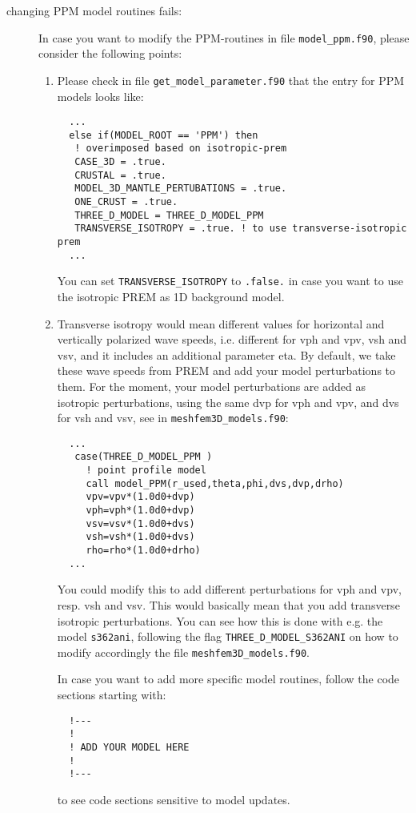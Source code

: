 \begin{description}
\item [changing PPM model routines fails:]
In case you want to modify the PPM-routines in file \texttt{model\_ppm.f90}, please consider the following points:

\begin{enumerate}
\item Please check in file \texttt{get\_model\_parameter.f90} that the entry for PPM models looks like:

{\footnotesize
\begin{verbatim}
  ...
  else if(MODEL_ROOT == 'PPM') then
   ! overimposed based on isotropic-prem
   CASE_3D = .true.
   CRUSTAL = .true.
   MODEL_3D_MANTLE_PERTUBATIONS = .true.
   ONE_CRUST = .true.
   THREE_D_MODEL = THREE_D_MODEL_PPM
   TRANSVERSE_ISOTROPY = .true. ! to use transverse-isotropic prem
  ...
\end{verbatim}
}

\noindent
You can set \texttt{TRANSVERSE\_ISOTROPY} to \texttt{.false.} in case you want to use the isotropic PREM
as 1D background model.\newline

\item Transverse isotropy would mean different values for horizontal and vertically polarized wave speeds,
i.e. different for vph and   vpv, vsh and vsv, and it includes an additional parameter eta.
By default, we take these wave speeds from PREM and add your model perturbations to them.
For the moment, your model perturbations are added as isotropic perturbations, using the same dvp for vph and vpv,
and dvs for vsh   and vsv, see in \texttt{meshfem3D\_models.f90}:

{\footnotesize
\begin{verbatim}
  ...
   case(THREE_D_MODEL_PPM )
     ! point profile model
     call model_PPM(r_used,theta,phi,dvs,dvp,drho)
     vpv=vpv*(1.0d0+dvp)
     vph=vph*(1.0d0+dvp)
     vsv=vsv*(1.0d0+dvs)
     vsh=vsh*(1.0d0+dvs)
     rho=rho*(1.0d0+drho)
  ...
\end{verbatim}
}

\noindent
You could modify this to add different perturbations for vph and vpv, resp. vsh and vsv.
This would basically mean that you add transverse isotropic perturbations.
You can see how this is done with e.g. the model \texttt{s362ani},
following the flag \texttt{THREE\_D\_MODEL\_S362ANI} on how to modify accordingly the file \texttt{meshfem3D\_models.f90}.\newline


In case you want to add more specific model routines, follow the code sections starting with:

{\footnotesize
\begin{verbatim}
  !---
  !
  ! ADD YOUR MODEL HERE
  !
  !---
\end{verbatim}
}

\noindent
to see code sections sensitive to model updates.

  \end{enumerate}

\end{description}



